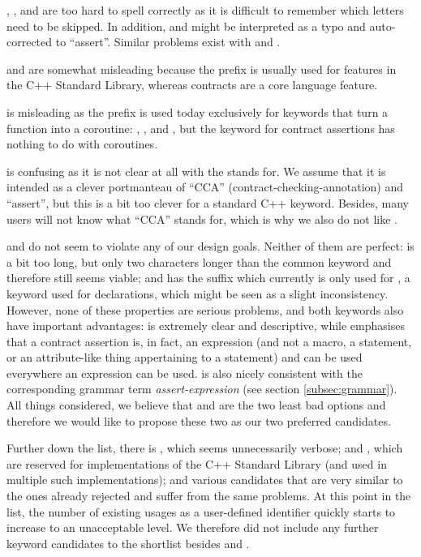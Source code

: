 , , and  are too hard to spell correctly as it is difficult to remember which letters need to be skipped. In addition,  and  might be interpreted as a typo and auto-corrected to ``assert''. Similar problems exist with  and .

 and  are somewhat misleading because the prefix  is usually used for features in the C++ Standard Library, whereas contracts are a core language feature.

 is misleading as the prefix  is used today exclusively for keywords that turn a function into a coroutine: , , and , but the keyword for contract assertions has nothing to do with coroutines.

 is confusing as it is not clear at all with the  stands for. We assume that it is intended as a clever portmanteau of ``CCA'' (contract-checking-annotation) and ``assert'', but this is a bit too clever for a standard C++ keyword. Besides, many users will not know what ``CCA'' stands for, which is why we also do not like .

 and  do not seem to violate any of our design goals. Neither of them are perfect:  is a bit too long, but only two characters longer than the common keyword  and therefore still seems viable; and  has the  suffix which currently is only used for , a keyword used for declarations, which might be seen as a slight inconsistency. However, none of these properties are serious problems, and both keywords also have important advantages: \mbox{} is extremely clear and descriptive, while  emphasises that a contract assertion is, in fact, an expression (and not a macro, a statement, or an attribute-like thing appertaining to a statement) and can be used everywhere an expression can be used.  is also nicely consistent with the corresponding grammar term \emph{assert-expression} (see section \ref{subsec:grammar}). All things considered, we believe that  and  are the two least bad options and therefore we would like to propose these two as our two preferred candidates.

Further down the list, there is , which seems unnecessarily verbose;  and , which are reserved for implementations of the C++ Standard Library (and used in multiple such implementations); and various candidates that are very similar to the ones already rejected and suffer from the same problems. At this point in the list, the number of existing usages as a user-defined identifier quickly starts to increase to an unacceptable level. We therefore did not include any further keyword candidates to the shortlist besides  and .

